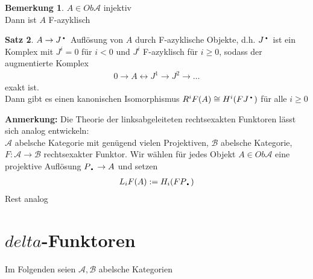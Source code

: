 \documentclass[10pt,a4paper,numbers=endperiod]{scrreprt}
\theoremstyle{definition}
\newtheorem{satz}{Satz}[section]
\newtheorem{bem}[satz]{Bemerkung}
\newcommand{\point}{\text{\textbullet}}
\begin{document}
\begin{bem}
	$A \in Ob \mathcal{A}$ injektiv\\
	Dann ist $A$ F-azyklisch
\end{bem}

\begin{satz}
	$A \to J^\point$ Auflösung von $A$ durch F-azyklische Objekte, d.h. $J^\point$ ist ein Komplex mit $J^i = 0$ für $i < 0$ und $J^i$ F-azyklisch für $i \geq 0$, sodass der augmentierte Komplex \begin{align*}
		 0 \longrightarrow A \longleftrightarrow J^1 \longrightarrow J^2 \longrightarrow \ldots
	\end{align*}
	exakt ist.\\
	Dann gibt es einen kanonischen Isomorphismus $R^iF(A) \cong H^i(FJ^\point)$ für alle $i \geq 0$
\end{satz}

\textbf{Anmerkung:} Die Theorie der linksabgeleiteten rechtsexakten Funktoren lässt sich analog entwickeln:\\
$\mathcal{A}$ abelsche Kategorie mit genügend vielen Projektiven, $\mathcal{B}$ abelsche Kategorie, $F: \mathcal{A} \to \mathcal{B}$ rechtsexakter Funktor. Wir wählen für jedes Objekt $A \in Ob \mathcal{A}$ eine projektive Auflösung $P_\point \to A$ und setzen \begin{align*}
	 L_iF(A) := H_i(FP_\point)
\end{align*}
Rest analog

\chapter{$delta$-Funktoren} 

Im Folgenden seien $\mathcal{A}, \mathcal{B}$ abelsche Kategorien\\
\end{document}
